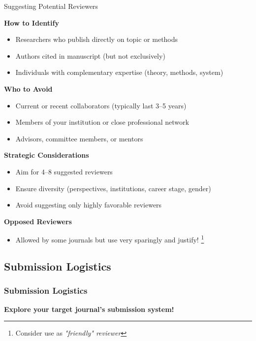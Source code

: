 \documentclass{beamer}
\begin{document}
\begin{frame}{Suggesting Potential Reviewers}

\textbf{How to Identify}
\begin{itemize}
    \item Researchers who publish directly on topic or methods
    \item Authors cited in manuscript (but not exclusively)
    \item Individuals with complementary expertise (theory, methods, system)
\end{itemize}

\medskip

\textbf{Who to Avoid}
\begin{itemize}
    \item Current or recent collaborators (typically last 3--5 years)
    \item Members of your institution or close professional network
    \item Advisors, committee members, or mentors
\end{itemize}

\medskip

\textbf{Strategic Considerations}
\begin{itemize}
    \item Aim for 4--8 suggested reviewers
    \item Ensure diversity (perspectives, institutions, career stage, gender)
    \item Avoid suggesting only highly favorable reviewers
\end{itemize}

\medskip

\textbf{Opposed Reviewers}
\begin{itemize}
    \item Allowed by some journals but use very sparingly and justify!%
    \footnote{\scriptsize{Consider use as \textit{"friendly" reviewer}}}
\end{itemize}

\end{frame}


\subsection{Submission Logistics}

\begin{frame}
  \frametitle{Submission Logistics}
  \begin{center}
      \textbf{Explore your target journal's submission system!}
  \end{center}
\end{frame}
\end{document}
